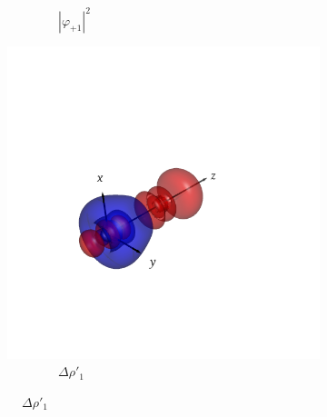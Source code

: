 \documentclass[journal=inoraj,manuscript=article]{achemso}
\begin{document}
\begin{figure}[!h]
\begin{subfigure}[t]{0.32\textwidth}
        \caption*{\ \ \ \ \ \ \ \ $|\varphi_{+1}|^2$} 
    \end{subfigure}
    \hfill
    \begin{subfigure}[t]{0.32\textwidth}
        \centering
        \includegraphics[width=\linewidth]{./AuCn+/pair1.png} 
        \caption*{\ \ \ \ \ \ \ \ $\Delta \rho'_1$} 
    \end{subfigure}


\end{figure}
\end{document}
